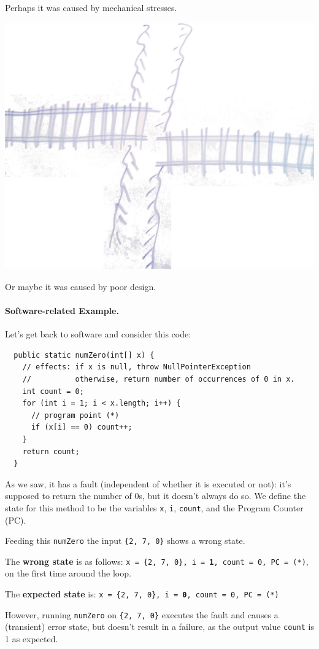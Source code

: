 \documentclass[11pt]{article}
\begin{document}
\newpage Perhaps it was caused by mechanical stresses.
\begin{center}
  \includegraphics[width=.7\textwidth]{L02/002_mechanical_fault}
\end{center}
Or maybe it was caused by poor design.

\paragraph{Software-related Example.}
Let's get back to software and consider this code:
\begin{lstlisting}
  public static numZero(int[] x) {
    // effects: if x is null, throw NullPointerException
    //          otherwise, return number of occurrences of 0 in x.
    int count = 0;
    for (int i = 1; i < x.length; i++) {
      // program point (*)
      if (x[i] == 0) count++; 
    } 
    return count;
  }
\end{lstlisting}
As we saw, it has a fault (independent of whether it is executed
or not): it's supposed to return the number of 0s, but it doesn't
always do so.
We define the state for this method to be the variables {\tt x},
{\tt i}, {\tt count}, and the Program Counter (PC).

Feeding this {\tt numZero} the input {\tt \{2, 7, 0\}} shows a wrong state.

The {\bf wrong state} is as follows: {\tt x = \{2, 7, 0\}, i = {\bf 1}, count = 0, PC = (*)}, on the first time around the loop.

The {\bf expected state} is: {\tt x = \{2, 7, 0\}, i = {\bf 0}, count = 0, PC = (*)}

However, running {\tt numZero} on {\tt \{2, 7, 0\}} executes the fault
and causes a (transient) error state, but doesn't result in a failure,
as the output value {\tt count} is 1 as expected.
\end{document}
